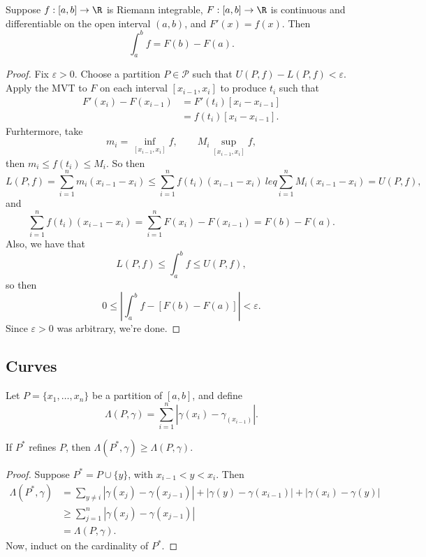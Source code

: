 \documentclass{notes}
\begin{document}
\begin{theorem}
  Suppose $f:[a,b] \to \R$ is Riemann integrable, $F: [a,b] \to \R$ is continuous and
  differentiable on the open interval $(a,b)$, and $F'(x) = f(x)$. Then 
  $$\int_a^b f = F(b) - F(a).$$
\end{theorem}
\begin{proof}
  Fix $\varepsilon > 0$. Choose a partition $P\in\mathcal{P}$ such that $U(P,f) - L(P,f) <
  \varepsilon.$ Apply the MVT to $F$ on each interval $[x_{i-1}, x_i]$ to produce $t_i$ such that 
  \begin{align*}
    F'(x_i) - F(x_{i-1}) &= F'(t_i) [x_i - x_{i-1}] \\
                         &= f(t_i)[x_i - x_{i-1}].
  \end{align*}
  Furhtermore, take $$m_i = \inf_{[x_{i-1}, x_i]} f, \qquad M_i \sup_{[x_{i-1}, x_i]} f,$$ then $m_i
  \leq f(t_i) \leq M_i.$ So then 
  $$L(P, f) = \sum_{i=1}^n m_i (x_{i-1} - x_i) \leq \sum_{i=1}^n f(t_i) (x_{i-1} - x_i) \ leq
  \sum_{i=1}^n M_i (x_{i-1} - x_i) = U(P,f),$$
  and 
  $$\sum_{i=1}^n f( t_i) (x_{i-1} - x_i) = \sum_{i=1}^n F(x_i) - F(x_{i-1}) = F(b) - F(a).$$
  Also, we have that 
  $$L(P,f) \leq \int_a^b f \leq U(P,f),$$ 
  so then 
  $$0 \leq \left| \int_a^b f - [F(b) - F(a)] \right| < \varepsilon.$$ Since $\varepsilon > 0$ was
  arbitrary, we're done.
\end{proof}

\subsection{Curves}
\begin{defn}
  Let $P = \{ x_1, \ldots, x_n \}$ be a partition of $[a,b]$, and define
  $$\Lambda(P, \gamma) = \sum_{i=1}^n |\gamma(x_i) - \gamma_(x_{i-1})|.$$
\end{defn}

\begin{lemma}
  If $P^*$ refines $P$, then $\Lambda(P^*, \gamma) \geq \Lambda(P, \gamma).$
\end{lemma}
\begin{proof}
  Suppose $P^* = P \cup \{y\}$, with $x_{i-1} < y < x_i.$ Then 
  \begin{align*}
    \Lambda(P^*, \gamma) &= \sum_{y\neq i} |\gamma(x_j) - \gamma(x_{j-1})| + |\gamma(y) -
    \gamma(x_{i-1})| + |\gamma(x_i) - \gamma(y)| \\
                         &\geq \sum_{j=1}^n |\gamma(x_j) - \gamma(x_{j-1})| \\
                         &= \Lambda(P, \gamma).
  \end{align*}
  Now, induct on the cardinality of $P^*$.
\end{proof}
\end{document}
